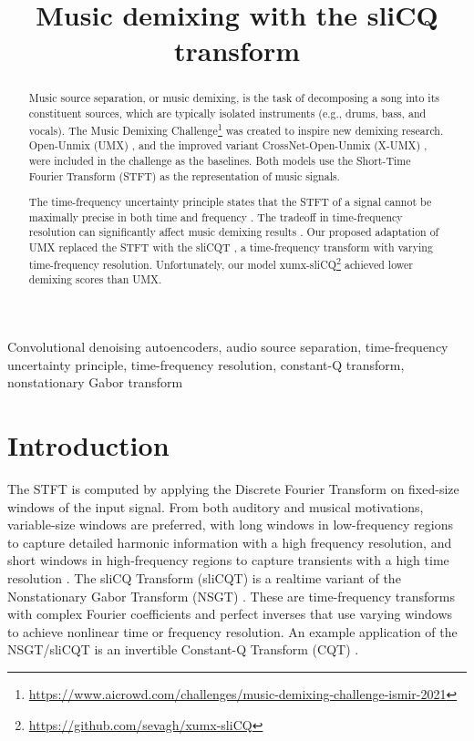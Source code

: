 \documentclass{article}
\title{Music demixing with the sliCQ transform}
\begin{document}
\ninept
%
\maketitle
%
\begin{abstract}
	Music source separation, or music demixing, is the task of decomposing a song into its constituent sources, which are typically isolated instruments (e.g., drums, bass, and vocals). The Music Demixing Challenge\footnote{\url{https://www.aicrowd.com/challenges/music-demixing-challenge-ismir-2021}} \cite{mdx21} was created to inspire new demixing research. Open-Unmix (UMX) \cite{umx}, and the improved variant CrossNet-Open-Unmix (X-UMX) \cite{xumx}, were included in the challenge as the baselines. Both models use the Short-Time Fourier Transform (STFT) as the representation of music signals.

	The time-frequency uncertainty principle states that the STFT of a signal cannot be maximally precise in both time and frequency \cite{gabor1946}. The tradeoff in time-frequency resolution can significantly affect music demixing results \cite{tftradeoff1}. Our proposed adaptation of UMX replaced the STFT with the sliCQT \cite{slicq}, a time-frequency transform with varying time-frequency resolution. Unfortunately, our model xumx-sliCQ\footnote{\url{https://github.com/sevagh/xumx-sliCQ}} achieved lower demixing scores than UMX.

\end{abstract}
%
\begin{keywords}
Convolutional denoising autoencoders, audio source separation, time-frequency uncertainty principle, time-frequency resolution, constant-Q transform, nonstationary Gabor transform
\end{keywords}
%
\section{Introduction}
\label{sec:intro}

The STFT is computed by applying the Discrete Fourier Transform on fixed-size windows of the input signal. From both auditory and musical motivations, variable-size windows are preferred, with long windows in low-frequency regions to capture detailed harmonic information with a high frequency resolution, and short windows in high-frequency regions to capture transients with a high time resolution \cite{doerflerphd}. The sliCQ Transform (sliCQT) \cite{slicq} is a realtime variant of the Nonstationary Gabor Transform (NSGT) \cite{balazs}. These are time-frequency transforms with complex Fourier coefficients and perfect inverses that use varying windows to achieve nonlinear time or frequency resolution. An example application of the NSGT/sliCQT is an invertible Constant-Q Transform (CQT) \cite{jbrown}.
\end{document}
